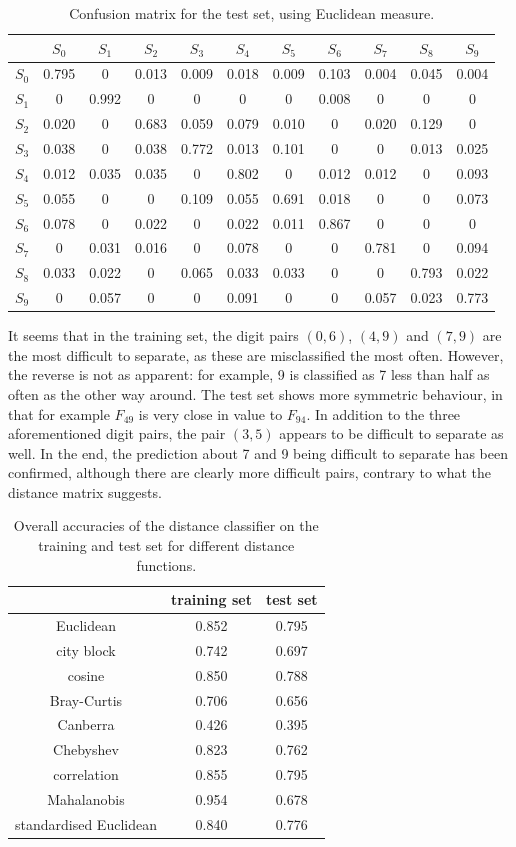 \documentclass[11pt]{article}
\begin{document}
\begin{table}
\centering
\small
\begin{tabular}{c|cccccccccc}
&$S_0$&$S_1$&$S_2$&$S_3$&$S_4$&$S_5$&$S_6$&$S_7$&$S_8$&$S_9$\\\hline
$S_0$&0.795&0&0.013&0.009&0.018&0.009&0.103&0.004&0.045&0.004\\
$S_1$&0&0.992&0&0&0&0&0.008&0&0&0\\
$S_2$&0.020&0&0.683&0.059&0.079&0.010&0&0.020&0.129&0\\
$S_3$&0.038&0&0.038&0.772&0.013&0.101&0&0&0.013&0.025\\
$S_4$&0.012&0.035&0.035&0&0.802&0&0.012&0.012&0&0.093\\
$S_5$&0.055&0&0&0.109&0.055&0.691&0.018&0&0&0.073\\
$S_6$&0.078&0&0.022&0&0.022&0.011&0.867&0&0&0\\
$S_7$&0&0.031&0.016&0&0.078&0&0&0.781&0&0.094\\
$S_8$&0.033&0.022&0&0.065&0.033&0.033&0&0&0.793&0.022\\
$S_9$&0&0.057&0&0&0.091&0&0&0.057&0.023&0.773
\end{tabular}
\caption{Confusion matrix for the test set, using Euclidean measure.}
\normalsize
\end{table}
It seems that in the training set, the digit pairs $(0, 6)$, $(4, 9)$ and $(7, 9)$ are the most difficult to separate, as these are misclassified the most often. However, the reverse is not as apparent: for example, 9 is classified as 7 less than half as often as the other way around. The test set shows more symmetric behaviour, in that for example $F_{49}$ is very close in value to $F_{94}$. In addition to the three aforementioned digit pairs, the pair $(3, 5)$ appears to be difficult to separate as well. In the end, the prediction about 7 and 9 being difficult to separate has been confirmed, although there are clearly more difficult pairs, contrary to what the distance matrix suggests.\par
\begin{table}[!b]
\centering
\small
\begin{tabular}{c|cc}
&training set&test set\\\hline
Euclidean&0.852&0.795\\
city block&0.742&0.697\\
cosine&0.850&0.788\\
Bray-Curtis&0.706&0.656\\
Canberra&0.426&0.395\\
Chebyshev&0.823&0.762\\
correlation&0.855&0.795\\
Mahalanobis&0.954&0.678\\
standardised Euclidean&0.840&0.776
\end{tabular}
\caption{Overall accuracies of the distance classifier on the training and test set for different distance functions.}
\normalsize
\end{table}
\end{document}

